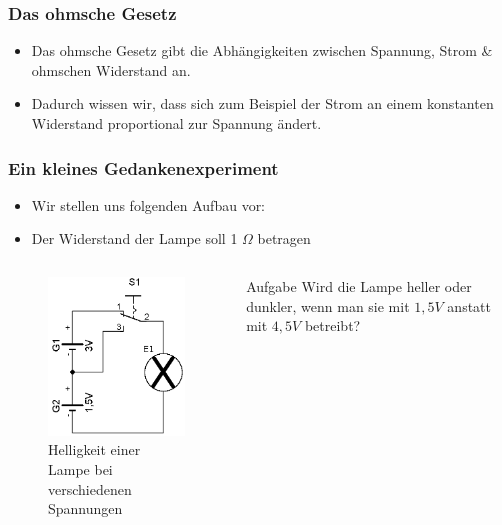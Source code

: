 \begin{frame}
	\frametitle{Das ohmsche Gesetz}
	\begin{itemize}
		\item	Das ohmsche Gesetz gibt die Abhängigkeiten zwischen Spannung, Strom \& ohmschen Widerstand an.
		\item	Dadurch wissen wir, dass sich zum Beispiel der Strom an einem konstanten Widerstand proportional zur Spannung ändert.
	\end{itemize}
\end{frame}

\begin{frame}
  \frametitle{Ein kleines Gedankenexperiment}
  \begin{itemize}
    \item Wir stellen uns folgenden Aufbau vor:
    \item Der Widerstand der Lampe soll 1 $\Omega$ betragen
  \end{itemize}
  \begin{columns}
    \begin{center}
      \begin{figure}
        \includegraphics[width=\textwidth,height=.6\textheight,keepaspectratio]{e03/Strom_Spannung_Abh.png}
        \caption{Helligkeit einer Lampe bei verschiedenen Spannungen}
      \end{figure}
    \end{center}
    \begin{exampleblock}{Aufgabe}
      Wird die Lampe heller oder dunkler, wenn man sie mit $1,5 V$ anstatt mit $4,5 V$ betreibt?
    \end{exampleblock}
  \end{columns}
\end{frame}

